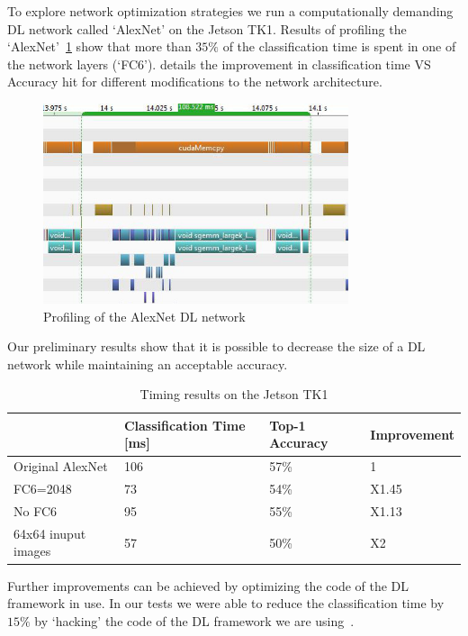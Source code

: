 \documentclass[a4paper]{article} %
\begin{document}
To explore network optimization strategies we run a computationally demanding DL
network called `AlexNet' on the Jetson TK1. Results of profiling the
`AlexNet'~\cref{fig:alex_time} show that more than $35\%$ of the classification
time is spent in one of the network layers (`FC6').  details
the improvement in classification time VS Accuracy hit for different
modifications to the network architecture.
\begin{figure}[h]
	\centering
	\includegraphics[width=0.8\textwidth]{alexnet_time_line_small}
	\caption{Profiling of the AlexNet DL network}
	\label{fig:alex_time}
\end{figure}
Our preliminary results show that it is possible to decrease the size of a DL
network while maintaining an acceptable accuracy.
\begin{table}
	\centering
	\begin{tabular}{ | l | l | l | l | }
		\hline
		                    & Classification Time [ms] & Top-1 Accuracy & Improvement \\ \hline
		Original AlexNet    & 106                      & 57\%           & 1           \\ \hline
		FC6=2048            & 73                       & 54\%           & X1.45       \\ \hline
		No FC6              & 95                       & 55\%           & X1.13       \\ \hline
		64x64 inuput images & 57                       & 50\%           & X2          \\ \hline
	\end{tabular}
	\caption{Timing results on the Jetson TK1}
	\label{tb:alexnet}
\end{table}
Further improvements can be achieved by optimizing the code of the DL framework
in use. In our tests we were able to reduce the classification time by $15\%$ by
`hacking' the code of the DL framework we are using~\cite{jia2014caffe}.
\end{document}
